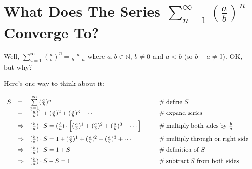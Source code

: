 \documentclass[11pt, oneside]{article}   	%
\begin{document}
\section*{What Does The Series $\sum\limits_{n = 1}^\infty (\frac{a}{b})^n $ Converge To?}

\noindent
Well,  $\sum\limits_{n = 1}^\infty (\frac{a}{b})^n  = \frac{a}{b \:-\: a}$ where $a,b \in \mathbb{N}$, $b \neq 0$ and $a < b$ (so $b - a \neq 0$). OK, but why?

\bigskip
\noindent
 Here's one way to think about it:  
      
\begin{equation*}
\begin{array}{lllll}
S
&=& \sum\limits_{n = 1}^\infty (\frac{a}{b})^n                                                                                                                              &\qquad  \mathrel{\#} \text{define $S$}                                           \\ 
\vspace{2.0mm}
&=& (\frac{a}{b})^1 + (\frac{a}{b})^2 + (\frac{a}{b})^3 + \cdots                                                                                                    &\qquad  \mathrel{\#} \text{expand series}                                      \\
\vspace{2.0mm}
&\Rightarrow& (\frac{b}{a}) \cdot S = (\frac{b}{a}) \cdot \Big [(\frac{a}{b})^1 + (\frac{a}{b})^2 + (\frac{a}{b})^3 + \cdots \Big ]   &\qquad  \mathrel{\#} \text{multiply both sides by $\frac{b}{a}$}      \\
\vspace{2.0mm}
&\Rightarrow&  (\frac{b}{a}) \cdot S = 1 +(\frac{a}{b})^1 + (\frac{a}{b})^2 + (\frac{a}{b})^3 + \cdots                                          &\qquad  \mathrel{\#} \text{multiply through on right side}                \\
\vspace{2.0mm}
&\Rightarrow&  (\frac{b}{a}) \cdot S = 1 + S                                                                                                                              &\qquad  \mathrel{\#} \text{definition of $S$}                                     \\
\vspace{2.0mm}
&\Rightarrow&  (\frac{b}{a}) \cdot S - S = 1                                                                                                                               &\qquad  \mathrel{\#} \text{subtract $S$ from both sides}                 \\

\end{array}
\end{equation*}
\end{document}
